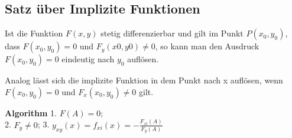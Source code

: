 \subsection{Satz über Implizite Funktionen}
\begin{footnotesize}
Ist die Funktion $F(x,y)$ stetig differenzierbar und gilt im Punkt $P(x_0,y_0)$, dass $F(x_0,y_0)=0$ und $F_y(x0,y0)\neq 0$, so kann man den Ausdruck $F(x_0,y_0)=0$ eindeutig nach $y_0$ auflösen.

Analog lässt sich die implizite Funktion in dem Punkt nach x auflösen, wenn $F(x_0,y_0)=0$ und $F_x(x_0,y_0)\neq0$ gilt.
\end{footnotesize}
\begin{footnotesize}
	\textbf{Algorithm} 1. $F(A) = 0$; \\2. $ F_y \neq 0$; 3. $y_{xy}(x) = f_{xi}(x) = -\frac{F_{xi}(A)}{F_y(A)}$
\end{footnotesize}
